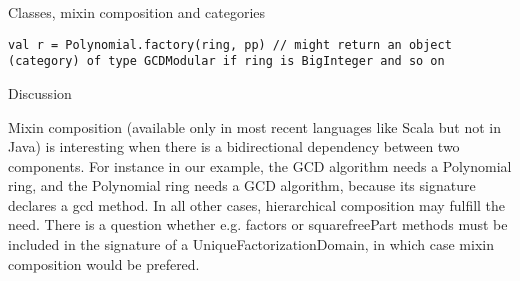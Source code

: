 \documentclass[final]{beamer}
\begin{document}
\begin{frame}[fragile]
\begin{columns}[t]
\begin{column}{.3\linewidth}
\begin{block}{\large Classes, mixin composition and categories}
\begin{lstlisting}
val r = Polynomial.factory(ring, pp) // might return an object
(category) of type GCDModular if ring is BigInteger and so on
\end{lstlisting}
  \end{block}
  \hfill
  \begin{block}{\large Discussion}
{\scriptsize
Mixin composition (available only in most recent languages like Scala
but not in Java) is interesting when there is a bidirectional dependency
between two components. For instance in our example, the GCD algorithm
needs a Polynomial ring, and the Polynomial ring needs a GCD algorithm,
because its signature declares a gcd method. In all other cases,
hierarchical composition may fulfill the need. There is a question
whether e.g. factors or squarefreePart methods must be included in the
signature of a UniqueFactorizationDomain, in which case mixin
composition would be prefered.
\par}\par
  \end{block}
\end{column}

\end{columns}

\end{frame}


%
%
%
%
%
\end{document}
